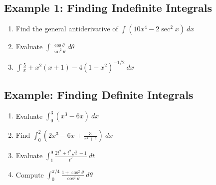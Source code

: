 \documentclass[10pt]{book}
\theoremstyle{definition}
\begin{document}
\subsection*{Example 1: Finding Indefinite Integrals}
\begin{enumerate}[label=(\alph*)]
    \item Find the general antiderivative of $\displaystyle\int(10x^4-2\sec^2x)\ dx$\vspace{3cm}
    \item Evaluate $\displaystyle\int\frac{\cos\theta}{\sin^2\theta}\ d\theta$\vspace{3cm}
    \item $\displaystyle\int\frac{5}{x}+x^2(x+1)-4(1-x^2)^{-1/2}\ dx$\vspace{3cm}
\end{enumerate}
\subsection*{Example: Finding Definite Integrals}
\begin{enumerate}[label=(\alph*)]
    \item Evaluate $\displaystyle\int_0^3(x^3-6x)\ dx$\vspace{5cm}
    \clearpage
    \item Find $\displaystyle\int_0^2\left(2x^3-6x+\frac{3}{x^2+1}\right)\ dx$\vspace{5cm}
    \item Evaluate $\displaystyle\int_1^9\frac{2t^2+t^2\sqrt{t}-1}{t^2}\ dt$\vspace{6cm}
    \item Compute $\displaystyle\int_0^{\pi/4}\frac{1+\cos^2\theta}{\cos^2\theta}\ d\theta$
\end{enumerate}
\end{document}
